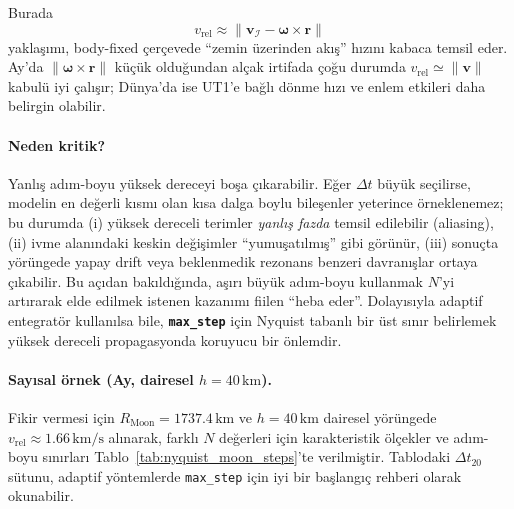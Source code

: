 Burada
\begin{equation}
v_{\text{rel}}\approx \|\mathbf v_{\mathcal I}-\boldsymbol{\omega}\times\mathbf r\|
\end{equation}
yaklaşımı, body-fixed çerçevede “zemin üzerinden akış” hızını kabaca temsil eder. Ay’da \(\|\boldsymbol{\omega}\times\mathbf r\|\)
küçük olduğundan alçak irtifada çoğu durumda \(v_{\text{rel}}\simeq \|\mathbf v\|\) kabulü iyi çalışır; Dünya’da ise UT1’e bağlı
dönme hızı ve enlem etkileri daha belirgin olabilir.

\paragraph{Neden kritik?}
Yanlış adım-boyu yüksek dereceyi boşa çıkarabilir. Eğer \(\Delta t\) büyük seçilirse, modelin en değerli kısmı olan
kısa dalga boylu bileşenler yeterince örneklenemez; bu durumda
(i) yüksek dereceli terimler \emph{yanlış fazda} temsil edilebilir (aliasing),
(ii) ivme alanındaki keskin değişimler “yumuşatılmış” gibi görünür,
(iii) sonuçta yörüngede yapay drift veya beklenmedik rezonans benzeri davranışlar ortaya çıkabilir.
Bu açıdan bakıldığında, aşırı büyük adım-boyu kullanmak \(N\)’yi artırarak elde edilmek istenen kazanımı fiilen “heba eder”.
Dolayısıyla adaptif entegratör kullanılsa bile, \textbf{\texttt{max\_step}} için Nyquist tabanlı bir üst sınır belirlemek
yüksek dereceli propagasyonda koruyucu bir önlemdir.

\paragraph{Sayısal örnek (Ay, dairesel \(h=40\,\mathrm{km}\)).}
Fikir vermesi için \(R_{\text{Moon}}=1737.4\,\mathrm{km}\) ve \(h=40\,\mathrm{km}\) dairesel yörüngede
\(v_{\text{rel}}\approx 1.66\,\mathrm{km/s}\) alınarak, farklı \(N\) değerleri için karakteristik ölçekler ve
adım-boyu sınırları Tablo~\ref{tab:nyquist_moon_steps}’te verilmiştir.
Tablodaki \(\Delta t_{20}\) sütunu, adaptif yöntemlerde \texttt{max\_step} için iyi bir başlangıç rehberi olarak okunabilir.

